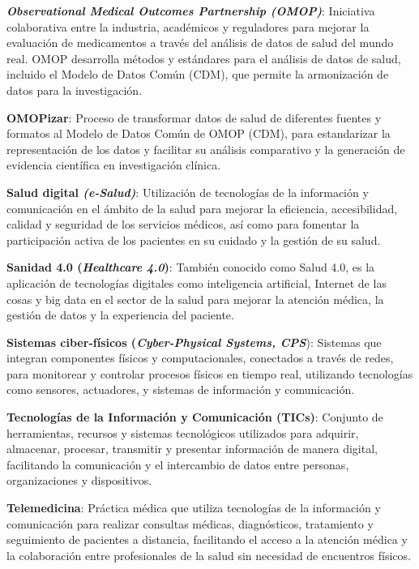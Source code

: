 \textit{\textbf{Observational Medical Outcomes Partnership (OMOP)}}: Iniciativa colaborativa entre la industria, académicos y reguladores para mejorar la evaluación de medicamentos a través del análisis de datos de salud del mundo real. OMOP desarrolla métodos y estándares para el análisis de datos de salud, incluido el Modelo de Datos Común (CDM), que permite la armonización de datos para la investigación.

\textbf{OMOPizar}: Proceso de transformar datos de salud de diferentes fuentes y formatos al Modelo de Datos Común de OMOP (CDM), para estandarizar la representación de los datos y facilitar su análisis comparativo y la generación de evidencia científica en investigación clínica.







\textbf{Salud digital \textit{(e-Salud)}}: Utilización de tecnologías de la información y comunicación en el ámbito de la salud para mejorar la eficiencia, accesibilidad, calidad y seguridad de los servicios médicos, así como para fomentar la participación activa de los pacientes en su cuidado y la gestión de su salud.

\textbf{Sanidad 4.0 (\textit{Healthcare 4.0})}: También conocido como Salud 4.0, es la aplicación de tecnologías digitales como inteligencia artificial, Internet de las cosas y big data en el sector de la salud para mejorar la atención médica, la gestión de datos y la experiencia del paciente.

\textbf{Sistemas ciber-físicos (\textit{Cyber-Physical Systems, CPS}}): Sistemas que integran componentes físicos y computacionales, conectados a través de redes, para monitorear y controlar procesos físicos en tiempo real, utilizando tecnologías como sensores, actuadores, y sistemas de información y comunicación.




\textbf{Tecnologías de la Información y Comunicación (TICs)}: Conjunto de herramientas, recursos y sistemas tecnológicos utilizados para adquirir, almacenar, procesar, transmitir y presentar información de manera digital, facilitando la comunicación y el intercambio de datos entre personas, organizaciones y dispositivos.

\textbf{Telemedicina}: Práctica médica que utiliza tecnologías de la información y comunicación para realizar consultas médicas, diagnósticos, tratamiento y seguimiento de pacientes a distancia, facilitando el acceso a la atención médica y la colaboración entre profesionales de la salud sin necesidad de encuentros físicos.







